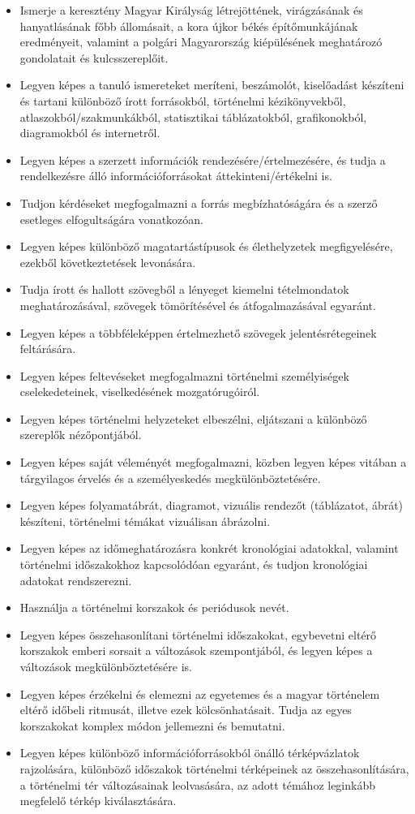 \begin{itemize}
\item Ismerje a keresztény Magyar Királyság létrejöttének, virágzásának és hanyatlásának főbb állomásait, a kora újkor békés építőmunkájának eredményeit, valamint a polgári Magyarország kiépülésének meghatározó gondolatait és kulcsszereplőit.
\item Legyen képes a tanuló ismereteket meríteni, beszámolót, kiselőadást készíteni és tartani különböző írott forrásokból, történelmi kézikönyvekből, atlaszokból/szakmunkákból, statisztikai táblázatokból, grafikonokból, diagramokból és internetről.
\item Legyen képes a szerzett információk rendezésére/értelmezésére, és tudja a rendelkezésre álló információforrásokat áttekinteni/értékelni is.
\item Tudjon kérdéseket megfogalmazni a forrás megbízhatóságára és a szerző esetleges elfogultságára vonatkozóan.
\item Legyen képes különböző magatartástípusok és élethelyzetek megfigyelésére, ezekből következtetések levonására.
\item Tudja írott és hallott szövegből a lényeget kiemelni tételmondatok meghatározásával, szövegek tömörítésével és átfogalmazásával egyaránt.
\item Legyen képes a többféleképpen értelmezhető szövegek jelentésrétegeinek feltárására.
\item Legyen képes feltevéseket megfogalmazni történelmi személyiségek cselekedeteinek, viselkedésének mozgatórugóiról.
\item Legyen képes történelmi helyzeteket elbeszélni, eljátszani a különböző szereplők nézőpontjából.
\item Legyen képes saját véleményét megfogalmazni, közben legyen képes vitában a tárgyilagos érvelés és a személyeskedés megkülönböztetésére.
\item Legyen képes folyamatábrát, diagramot, vizuális rendezőt (táblázatot, ábrát) készíteni, történelmi témákat vizuálisan ábrázolni.
\item Legyen képes az időmeghatározásra konkrét kronológiai adatokkal, valamint történelmi időszakokhoz kapcsolódóan egyaránt, és tudjon kronológiai adatokat rendszerezni.
\item Használja a történelmi korszakok és periódusok nevét.
\item Legyen képes összehasonlítani történelmi időszakokat, egybevetni eltérő korszakok emberi sorsait a változások szempontjából, és legyen képes a változások megkülönböztetésére is.
\item Legyen képes érzékelni és elemezni az egyetemes és a magyar történelem eltérő időbeli ritmusát, illetve ezek kölcsönhatásait. Tudja az egyes korszakokat komplex módon jellemezni és bemutatni.
\item Legyen képes különböző információforrásokból önálló térképvázlatok rajzolására, különböző időszakok történelmi térképeinek az összehasonlítására, a történelmi tér változásainak leolvasására, az adott témához leginkább megfelelő térkép kiválasztására.
\end{itemize}

